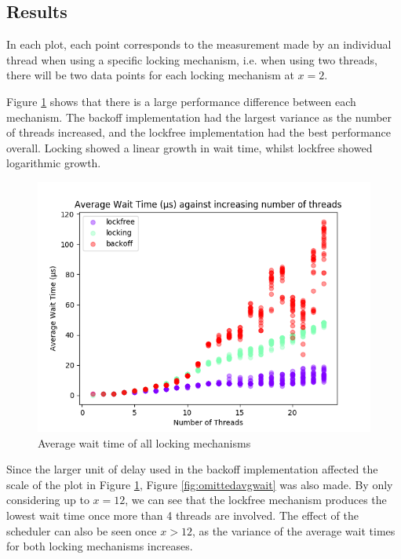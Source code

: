 \documentclass[12pt]{article}
\begin{document}
\subsection{Results}

In each plot, each point corresponds to the measurement made by an individual thread when using a specific locking mechanism, i.e. when using two threads, there will be two data points for each locking mechanism at $x = 2$.

Figure \ref{fig:mergedavgwait} shows that there is a large performance difference between each mechanism. The backoff implementation had the largest variance as the number of threads increased, and the lockfree implementation had the best performance overall. Locking showed a linear growth in wait time, whilst lockfree showed logarithmic growth.

\begin{figure}[!h]
\centering
  \centering
	\includegraphics[width=0.8\linewidth]{images/mergedAverageWait}
	\caption{Average wait time of all locking mechanisms}
	\label{fig:mergedavgwait}
\end{figure}

Since the larger unit of delay used in the backoff implementation affected the scale of the plot in Figure \ref{fig:mergedavgwait}, Figure \ref{fig:omittedavgwait} was also made. By only considering up to $x = 12$, we can see that the lockfree mechanism produces the lowest wait time once more than 4 threads are involved. The effect of the scheduler can also be seen once $x > 12$, as the variance of the average wait times for both locking mechanisms increases. 
\end{document}

